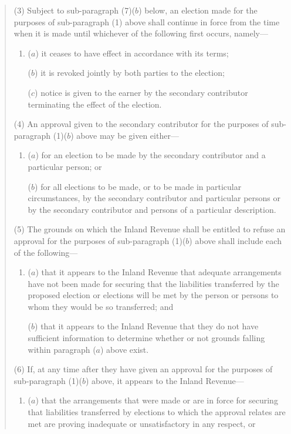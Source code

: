\documentclass[12pt,a4paper]{article}
\begin{document}
\begin{quotation}
(3) Subject to sub-paragraph (7)($b$)  below, an election made for the purposes of sub-paragraph (1)  above shall continue in force from the time when it is made until whichever of the following first occurs, namely—
\begin{enumerate}\item[]
($a$) it ceases to have effect in accordance with its terms;

($b$) it is revoked jointly by both parties to the election;

($c$) notice is given to the earner by the secondary contributor terminating the effect of the election.
\end{enumerate}

(4) An approval given to the secondary contributor for the purposes of sub-paragraph (1)($b$)  above may be given either—
\begin{enumerate}\item[]
($a$) for an election to be made by the secondary contributor and a particular person; or

($b$) for all elections to be made, or to be made in particular circumstances, by the secondary contributor and particular persons or by the secondary contributor and persons of a particular description.
\end{enumerate}

(5) The grounds on which the Inland Revenue shall be entitled to refuse an approval for the purposes of sub-paragraph (1)($b$)  above shall include each of the following—
\begin{enumerate}\item[]
($a$) that it appears to the Inland Revenue that adequate arrangements have not been made for securing that the liabilities transferred by the proposed election or elections will be met by the person or persons to whom they would be so transferred; and

($b$) that it appears to the Inland Revenue that they do not have sufficient information to determine whether or not grounds falling within paragraph ($a$)  above exist.
\end{enumerate}

(6) If, at any time after they have given an approval for the purposes of sub-paragraph (1)($b$)  above, it appears to the Inland Revenue—
\begin{enumerate}\item[]
($a$) that the arrangements that were made or are in force for securing that liabilities transferred by elections to which the approval relates are met are proving inadequate or unsatisfactory in any respect, or


\end{enumerate}
\end{quotation}
\end{document}
